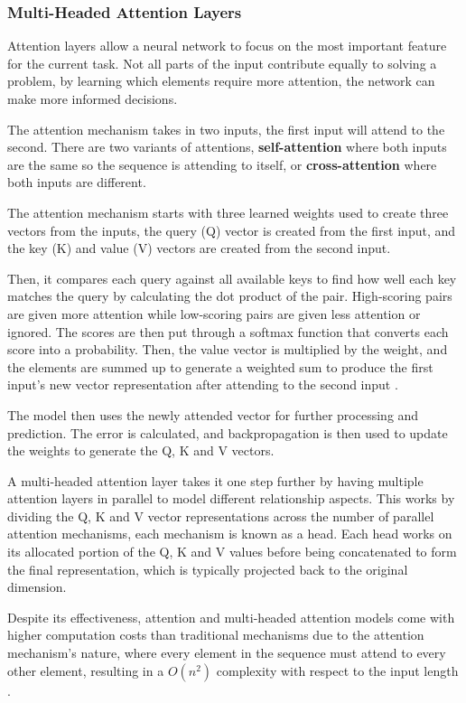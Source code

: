 \subsubsection{Multi-Headed Attention Layers} \label{ML:AttentionMechanism}
Attention layers allow a neural network to focus on the most important feature for the current task. Not all parts of the input contribute equally to solving a problem, by learning which elements require more attention, the network can make more informed decisions. 

The attention mechanism takes in two inputs, the first input will attend to the second. There are two variants of attentions, \textbf{self-attention} where both inputs are the same so the sequence is attending to itself, or \textbf{cross-attention} where both inputs are different.

The attention mechanism starts with three learned weights used to create three vectors from the inputs, the query (Q) vector is created from the first input, and the key (K) and value (V) vectors are created from the second input. 

Then, it compares each query against all available keys to find how well each key matches the query by calculating the dot product of the pair. High-scoring pairs are given more attention while low-scoring pairs are given less attention or ignored. The scores are then put through a softmax function that converts each score into a probability. Then, the value vector is multiplied by the weight, and the elements are summed up to generate a weighted sum to produce the first input's new vector representation after attending to the second input \cite{AttentionIsAllYouNeed}.

The model then uses the newly attended vector for further processing and prediction. The error is calculated, and backpropagation is then used to update the weights to generate the Q, K and V vectors.

A multi-headed attention layer takes it one step further by having multiple attention layers in parallel to model different relationship aspects. This works by dividing the Q, K and V vector representations across the number of parallel attention mechanisms, each mechanism is known as a head. Each head works on its allocated portion of the Q, K and V values before being concatenated to form the final representation, which is typically projected back to the original dimension.

Despite its effectiveness, attention and multi-headed attention models come with higher computation costs than traditional mechanisms due to the attention mechanism's nature, where every element in the sequence must attend to every other element, resulting in a $O(n^2)$ complexity with respect to the input length \cite{AttentionComplexity}.



